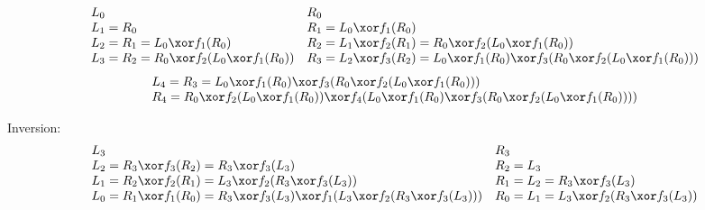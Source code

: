 \begin{equation*}
 	\begin{array}{ll}
 		L_0 & R_0\\
 		L_1= R_0 & R_1 = L_0 \xor f_1(R_0)\\
 		L_2= R_1 = L_0 \xor f_1(R_0) & R_2 = L_1 \xor f_2(R_1) = R_0 \xor f_2( L_0 \xor f_1(R_0))\\
 		L_3= R_2 = R_0 \xor f_2( L_0 \xor f_1(R_0)) & R_3 = L_2 \xor f_3(R_2) = L_0 \xor f_1(R_0) \xor f_3(R_0 \xor f_2( L_0 \xor f_1(R_0)))\\
 	\end{array}
\end{equation*}
\begin{equation*}
	\begin{array}{l}
		L_4= R_3 =  L_0 \xor f_1(R_0) \xor f_3(R_0 \xor f_2( L_0 \xor f_1(R_0))) \\
		R_4 = R_0 \xor f_2( L_0 \xor f_1(R_0)) \xor f_4(L_0 \xor f_1(R_0) \xor f_3(R_0 \xor f_2( L_0 \xor f_1(R_0)))) \\
	\end{array}
\end{equation*}

Inversion: 
\begin{equation*}
	\begin{array}{ll}
		L_3 & R_3\\
		L_2= R_3 \xor f_3(R_2) = R_3 \xor f_3(L_3) & R_2 = L_3 \\
		L_1= R_2 \xor f_2(R_1) = L_3 \xor f_2(R_3 \xor f_3(L_3)) & R_1 = L_2 = R_3 \xor f_3(L_3)\\
		L_0 = R_1 \xor f_1(R_0) = R_3 \xor f_3(L_3) \xor f_1(L_3 \xor f_2(R_3 \xor f_3(L_3))) & R_0 = L_1 = L_3 \xor f_2(R_3 \xor f_3(L_3))\\
	\end{array}
\end{equation*}

